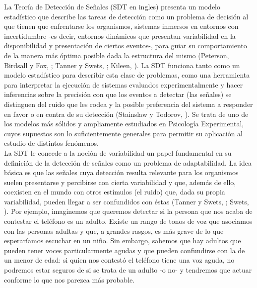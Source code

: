 La Teoría de Detección de Señales (SDT en ingles) presenta un modelo estadístico que describe las tareas de detección como un problema de decisión al que tienen que enfrentarse los organismos, sistemas inmersos en entornos con incertidumbre -es decir, entornos dinámicos que presentan variabilidad en la disponibilidad y presentación de ciertos eventos-, para guiar su comportamiento de la manera más óptima posible dada la estructura del mismo (Peterson, Birdsall y Fox, \citeyear{Peterson1954}; Tanner y Swets, \citeyear{Tanner1954}; Kileen, \citeyear{Killeen2014}). La SDT funciona tanto como un modelo estadístico para describir esta clase de problemas, como una herramienta para interpretar la ejecución de sistemas evaluados experimentalmente y hacer inferencias sobre la precisión con que los eventos a detectar (las señales) se distinguen del ruido que les rodea y la posible preferencia del sistema a responder en favor o en contra de su detección (Stainslaw y Todorov, \citeyear{Stainslaw1999}). Se trata de uno de los modelos más sólidos y ampliamente estudiados en Psicología Experimental, cuyos supuestos son lo suficientemente generales para permitir su aplicación al estudio de distintos fenómenos. \\

La SDT le concede a la noción de variabilidad un papel fundamental en su definición de la detección de señales como un problema de adaptabilidad. La idea básica es que las señales cuya detección resulta relevante para los organismos suelen presentarse y percibirse con cierta variabilidad y que, además de ello, coexisten en el mundo con otros estímulos (el ruido) que, dada su propia variabilidad, pueden llegar a ser confundidos con éstas (Tanner y Swets, \citeyear{Tanner1954}; Swets, \citeyear{Swets1973}). Por ejemplo, imaginemos que queremos detectar si la persona que nos acaba de contestar el teléfono es un adulto. Existe un rango de tonos de voz que asociamos con las personas adultas y que, a grandes rasgos, es más grave de lo que esperaríamos escuchar en un niño. Sin embargo, sabemos que hay adultos que pueden tener voces particularmente agudas y que pueden confundirse con la de un menor de edad: si quien nos contestó el teléfono tiene una voz aguda, no podremos estar seguros de si se trata de un adulto -o no- y tendremos que actuar conforme lo que nos parezca más probable.\\

